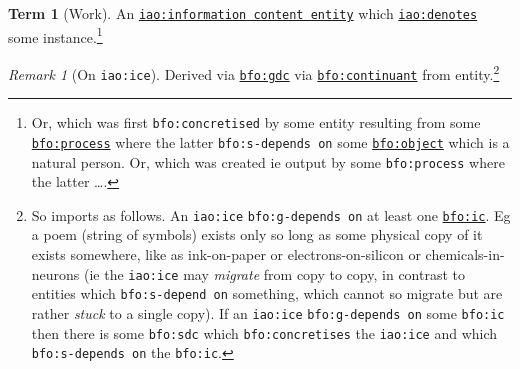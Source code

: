 \documentclass{amsart}%
\newcommand{\code}[1]{\texttt{#1}}%
\newcommand{\mention}[1]{\textit{#1}}%
\theoremstyle{plain}
\theoremstyle{definition}
\theoremstyle{remark}
\theoremstyle{definition}
\newtheorem{term}{Term}[subsection]%
\theoremstyle{remark}
\newtheorem*{term-note}{Remark}
\begin{document}
%
%
%
%
%
\begin{term}[Work]
\label{term:work}
An \href{http://purl.obolibrary.org/obo/IAO_0000030}{\code{iao:information content entity}} which \href{http://purl.obolibrary.org/obo/IAO_0000219}{\code{iao:denotes}} some instance.\footnote{Or, which was first \code{bfo:concretised} by some entity resulting from some \href{http://purl.obolibrary.org/obo/BFO_0000015}{\code{bfo:process}} where the latter \code{bfo:s-depends on} some \href{http://purl.obolibrary.org/obo/BFO_0000030}{\code{bfo:object}} which is a natural person. Or, which was created ie output by some \code{bfo:process} where the latter \ldots.}%
\begin{term-note}[On \code{iao:ice}]
Derived via \href{http://purl.obolibrary.org/obo/BFO_0000031}{\code{bfo:gdc}} via \href{http://purl.obolibrary.org/obo/BFO_0000002}{\code{bfo:continuant}} from entity.\footnote{So imports as follows. An \code{iao:ice} \code{bfo:g-depends on} at least one \href{http://purl.obolibrary.org/obo/BFO_0000004}{\code{bfo:ic}}. Eg a poem (string of symbols) %
%
%
exists only so long as some physical copy of it exists somewhere, like as ink-on-paper or electrons-on-silicon or chemicals-in-neurons (ie the \code{iao:ice} may \mention{migrate} from copy to copy, in contrast to entities which \code{bfo:s-depend on} something, which cannot so migrate but are rather \mention{stuck} to a single copy). If an \code{iao:ice} \code{bfo:g-depends on} some \code{bfo:ic} then there is some \code{bfo:sdc} which \code{bfo:concretises} the \code{iao:ice} and which \code{bfo:s-depends on} the \code{bfo:ic}. %
}
\end{term-note}
\end{term}
\end{document}
